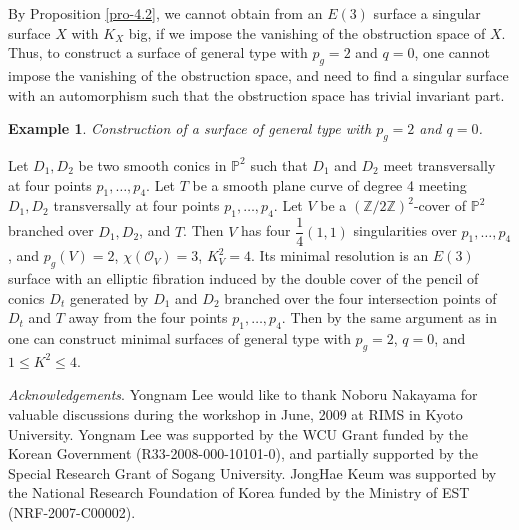 \documentclass[twoside,11pt]{amsart}
\newtheorem{example}{Example}[section]
\begin{document}
By Proposition \ref{pro-4.2},  we cannot obtain from an $E(3)$
surface a singular surface $X$ with $K_X$ big, if we impose the
vanishing of the obstruction space of $X$. Thus, to construct a
surface of general type with $p_g=2$ and $q=0$, one cannot impose
the vanishing of the obstruction space, and need to find a
singular surface with an automorphism such that the obstruction
space has trivial invariant part.

\begin{example} Construction of a surface of general type
with $p_g=2$ and $q=0$.
\end{example}  Let
$D_1, D_2$ be two smooth conics in ${{\mathbb P}}^2$ such that $D_1$ and
$D_2$ meet transversally at four points $p_1, \ldots, p_4$. Let
$T$ be a smooth plane curve of degree 4 meeting $D_1, D_2$
transversally at four points $p_1, \ldots, p_4$. Let $V$ be a
$({{\mathbb Z}}/2{{\mathbb Z}})^2$-cover of ${{\mathbb P}}^2$ branched over $D_1, D_2$, and $T$.
Then $V$ has four $\dfrac{1}{4}(1,1)$ singularities over $p_1,
\ldots, p_4$, and $p_g(V)=2$, $\chi({{\mathcal O}}_V)=3$, $K_V^2=4$. Its
minimal resolution is an $E(3)$ surface with an elliptic fibration
induced by the double cover of the pencil of conics $D_t$
generated by $D_1$ and $D_2$ branched over the four intersection
points of $D_t$ and $T$ away from the four points $p_1, \ldots,
p_4$. Then by the same argument as in \cite{Lee} one can construct
minimal surfaces of general type with $p_g=2$, $q=0$, and $1\le
K^2\le 4$.

{\medskip}

{\em Acknowledgements}. Yongnam Lee would like to thank Noboru
Nakayama for valuable discussions during the workshop in June,
2009 at RIMS in Kyoto University. Yongnam Lee was supported by the
WCU Grant funded by the Korean Government (R33-2008-000-10101-0),
and partially supported by the Special Research Grant of Sogang
University. JongHae Keum was supported by the National Research
Foundation of Korea funded by the Ministry of EST
(NRF-2007-C00002).
\end{document}
